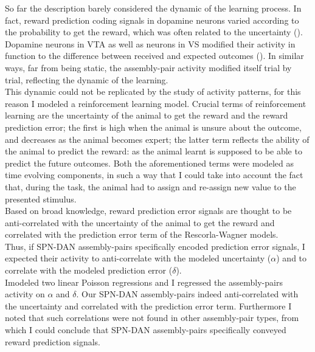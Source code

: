 So far the description barely considered the dynamic of the learning process. In fact, reward prediction coding signals in dopamine neurons varied according to the probability to get the reward, which was often related to the uncertainty (\cite{Schultz1992}). Dopamine neurons in VTA as well as neurons in VS modified their activity in function to the difference between received and expected outcomes (\cite{Fiorillo}). In similar ways, far from being static, the assembly-pair activity modified itself trial by trial, reflecting the dynamic of the learning.\\This dynamic could not be replicated by the study of activity patterns, for this reason I modeled a reinforcement learning model. Crucial terms of reinforcement learning are the uncertainty of the animal to get the reward and the reward prediction error; the first is high when the animal is unsure about the outcome, and decreases as the animal becomes expert; the latter term reflects the ability of the animal to predict the reward: as the animal learnt is supposed to be able to predict the future outcomes. Both the aforementioned terms were modeled as time evolving components, in such a way that I could take into account the fact that, during the task, the animal had to assign and re-assign new value to the presented stimulus.\\Based on broad knowledge, reward prediction error signals are thought to be anti-correlated with the uncertainty of the animal to get the reward and correlated with the prediction error term of the Rescorla-Wagner models.\\Thus, if SPN-DAN assembly-pairs specifically encoded prediction error signals, I expected their activity to anti-correlate with the modeled uncertainty ($\alpha$) and to correlate with the modeled prediction error ($\delta$).\\Imodeled two linear Poisson regressions and I regressed the assembly-pairs activity on $\alpha$ and $\delta$. Our SPN-DAN assembly-pairs indeed anti-correlated with the uncertainty and correlated with the prediction error term. Furthermore I noted that such correlations were not found in other assembly-pair types, from which I could conclude that SPN-DAN assembly-pairs specifically conveyed reward prediction signals.  